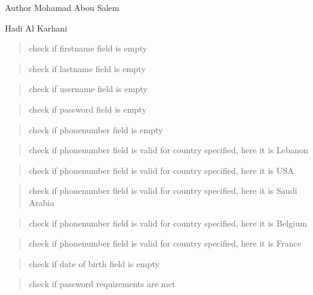 \begin{DoxyAuthor}{Author}
Mohamad Abou Salem 

Hadi Al Karhani 
\end{DoxyAuthor}
\begin{quote}
check if firstname field is empty \end{quote}


\begin{quote}
check if lastname field is empty \end{quote}


\begin{quote}
check if username field is empty \end{quote}


\begin{quote}
check if password field is empty \end{quote}


\begin{quote}
check if phonenumber field is empty \end{quote}


\begin{quote}
check if phonenumber field is valid for country specified, here it is Lebanon \end{quote}


\begin{quote}
check if phonenumber field is valid for country specified, here it is U\+SA \end{quote}


\begin{quote}
check if phonenumber field is valid for country specified, here it is Saudi Arabia \end{quote}


\begin{quote}
check if phonenumber field is valid for country specified, here it is Belgium \end{quote}


\begin{quote}
check if phonenumber field is valid for country specified, here it is France \end{quote}


\begin{quote}
check if date of birth field is empty \end{quote}


\begin{quote}
check if password requirements are met \end{quote}


